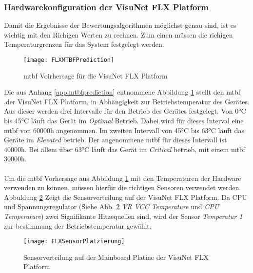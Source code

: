 \subsubsection*{Hardwarekonfiguration der VisuNet FLX Platform}\label{sec:FLXHardwarekonfiguration}
Damit die Ergebnisse der Bewertungsalgorithmen möglichst genau sind, ist es wichtig mit den Richigen Werten zu rechnen. Zum einen müssen die richigen Temperaturgrenzen für das System festgelegt werden. 
\begin{center}
    \begin{figure}[h!]
        \centering
        \texttt{[image: FLXMTBFPrediction]}
        \caption{\ac{mtbf} Voirhersage für die VisuNet FLX Platform}
        \label{fig:FLXMTBF}
    \end{figure}
\end{center}
\vspace{-1.8cm}
Die aus Anhang \ref{app:mtbfprediction} entnommene Abbildung \ref{fig:FLXMTBF} stellt den \ac{mtbf} ,der VisuNet FLX Platform, in Abhängigkeit zur Betriebstemperatur des Gerätes. Aus dieser werden drei Intervalle für den Betrieb des 
Gerätes festgelegt. Von 0°C bis 45°C läuft das Gerät im \textit{Optimal} Betrieb. Dabei wird für dieses Interval eine \ac{mtbf} von 60000h angenommen. Im zweiten Intervall von 45°C bis 63°C läuft das Geräte im \textit{Elevated} betrieb. Der angenommene \ac{mtbf} für dieses Intervall ist 40000h. Bei allem über 63°C läuft das Gerät im \textit{Critical} betrieb, mit einem \ac{mtbf} 30000h.\\
\\
Um die \ac{mtbf} Vorhersage aus Abbildung \ref{fig:FLXMTBF} mit den Temperaturen der Hardware verwenden zu können, müssen hierfür die richtigen Sensoren verwendet werden. Abbuldung \ref{fig:FLXSensoren} Zeigt die Sensorverteilung auf der VisuNet FLX Platform. Da CPU und Spannungsregulator (Siehe Abb. \ref{fig:FLXSensoren} \textit{VR VCC Temperature} und \textit{CPU Temperature}) zwei Signifikante Hitzequellen sind, wird der Sensor \textit{Temperatur 1} zur bestimmung der Betriebstemperatur gewählt. 
\begin{center}
    \begin{figure}[h!]
        \centering
        \texttt{[image: FLXSensorPlatzierung]}
        \caption{Sensorverteilung auf der Mainboard Platine der VisuNet FLX Platform}
        \label{fig:FLXSensoren}
    \end{figure}
\end{center}
\vspace{-1.8cm}  

